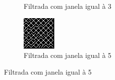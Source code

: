 \documentclass[10pt,a4paper]{article}
\begin{document}
\begin{figure}[!ht]
\begin{subfigure}[ht]{0.20\textwidth}
        \caption{Filtrada com janela igual à 3}
    \end{subfigure}
    \qquad
    \begin{subfigure}[ht]{0.20\textwidth}
        \includegraphics[width=\textwidth]{1_filtered_window_5.jpg}
        \caption{Filtrada com janela igual à 5}
    \end{subfigure}
\end{figure}
\end{document}
